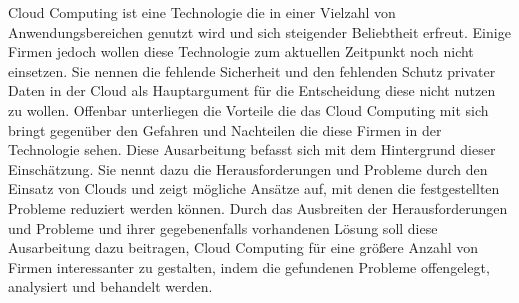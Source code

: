 Cloud Computing ist eine Technologie die in einer Vielzahl von Anwendungsbereichen genutzt wird und sich steigender Beliebtheit erfreut. Einige Firmen jedoch wollen diese Technologie zum aktuellen Zeitpunkt noch nicht einsetzen. Sie nennen die fehlende Sicherheit und den fehlenden Schutz privater Daten in der Cloud als Hauptargument für die Entscheidung diese nicht nutzen zu wollen. Offenbar unterliegen die Vorteile die das Cloud Computing mit sich bringt gegenüber den Gefahren und Nachteilen die diese Firmen in der Technologie sehen. Diese Ausarbeitung befasst sich mit dem Hintergrund dieser Einschätzung. Sie nennt dazu die Herausforderungen und Probleme durch den Einsatz von Clouds und zeigt mögliche Ansätze auf, mit denen die festgestellten Probleme reduziert werden können. Durch das Ausbreiten der Herausforderungen und Probleme und ihrer gegebenenfalls vorhandenen Lösung soll diese Ausarbeitung dazu beitragen, Cloud Computing für eine größere Anzahl von Firmen interessanter zu gestalten, indem die gefundenen Probleme offengelegt, analysiert und behandelt werden.
